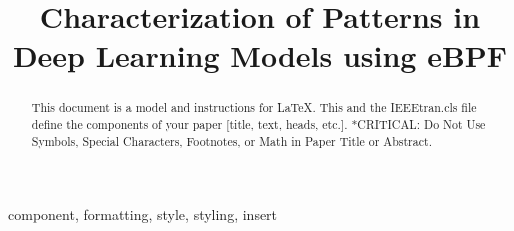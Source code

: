 \documentclass[conference]{IEEEtran}
\begin{document}
\title{Characterization of Patterns in Deep Learning Models using eBPF\\
}

\author{
	\and
	\and
}

\maketitle

\begin{abstract}
	This document is a model and instructions for \LaTeX.
	This and the IEEEtran.cls file define the components of your paper [title, text, heads, etc.]. *CRITICAL: Do Not Use Symbols, Special Characters, Footnotes,
	or Math in Paper Title or Abstract.
\end{abstract}

\begin{IEEEkeywords}
	component, formatting, style, styling, insert
\end{IEEEkeywords}
\end{document}
